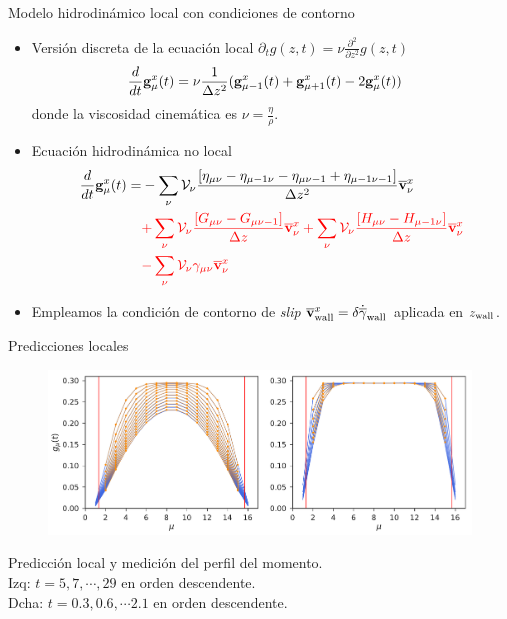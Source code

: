 \documentclass{beamer}
\begin{document}
\begin{frame}{Modelo hidrodinámico local con condiciones de contorno}  
  \begin{itemize}
    \item Versión discreta de la ecuación local $\partial_t g(z,t)=\nu\frac{\partial^2}{\partial z^2} g(z,t)$
\begin{align}
  \frac{d}{dt}{\bf g}^x_\mu(t)&=\nu \frac{1}{\Delta z^2}({\bf g}^x_{\mu-1}(t)+{\bf g}^x_{\mu+1}(t)-2{\bf g}^x_{\mu}(t))
\nonumber
\end{align}
donde la viscosidad cinemática es $\nu=\frac{\eta}{\rho}$.
    \item Ecuación hidrodinámica no local 
\begin{align}
  \frac{d}{dt}{\bf g}^x_\mu(t)=&
-\sum_{\nu} {\cal V}_\nu \frac{\left[\eta_{\mu\nu}-\eta_{\mu-1\nu}-\eta_{\mu\nu-1}+\eta_{\mu-1\nu-1}\right]}{\Delta z^2}\overline{\bf v}^x_\nu \nonumber \\
  &{\color{red}+\sum_{\nu} {\cal V}_\nu\frac{\left[G_{\mu\nu}-G_{\mu\nu-1}\right]}{\Delta z}\overline{\bf v}^x_\nu
+\sum_{\nu} {\cal V}_\nu\frac{\left[H_{\mu\nu}-H_{\mu-1\nu}\right]}{\Delta z}
  \overline{\bf v}^x_\nu}
\nonumber \\
  &{\color{red}-\sum_{\nu} {\cal V}_\nu\gamma_{\mu\nu}\overline{\bf v}^x_\nu}
\nonumber
\end{align}
\item Empleamos la condición de contorno de \textit{slip} $\overline{\bf v}_{\rm wall}^x=\delta \dot{\overline{\gamma}}_{\rm wall}$ aplicada en $z_{\rm wall}$.
  \end{itemize}
\end{frame}



\begin{frame}{Predicciones locales}
\begin{figure}[]
\includegraphics[width=\linewidth]{gxtLocalPrediction-17nodes-WALLS}
\end{figure}
  {\color{orange} Predicción local}
  y {\color{blue} medición} del perfil del momento.\\
  Izq: $t=5,7,\cdots,29$  en orden descendente.\\
  Dcha: $t=0.3,0.6,\cdots2.1$ en orden descendente.
\end{frame}
\end{document}
